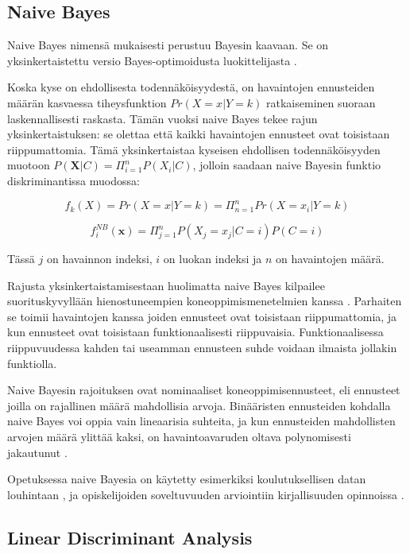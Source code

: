 \documentclass[finnish,twoside,openright]{HYgraduMLDS}
\begin{document}
\subsection{Naive Bayes}

Naive Bayes nimensä mukaisesti perustuu Bayesin kaavaan. Se on yksinkertaistettu versio Bayes-optimoidusta luokittelijasta \cite{rish2001empirical}.

Koska kyse on ehdollisesta todennäköisyydestä, on havaintojen ennusteiden määrän kasvaessa tiheysfunktion $Pr(X = x | Y = k)$ ratkaiseminen suoraan laskennallisesti raskasta. Tämän vuoksi naive Bayes tekee rajun yksinkertaistuksen: se olettaa että kaikki havaintojen ennusteet ovat toisistaan riippumattomia. Tämä yksinkertaistaa kyseisen ehdollisen todennäköisyyden muotoon $P(\textbf{X}|C) = \Pi^n_{i=1} P(X_i | C)$, jolloin saadaan naive Bayesin funktio diskriminantissa muodossa:

\begin{equation}
    f_k(X) = Pr(X = x | Y = k) = \Pi^n_{n=1} Pr(X = x_i | Y = k)
\end{equation}

\begin{equation}
    f^{NB}_i(\textbf{x}) = \Pi^n_{j=1} P(X_j=x_j | C=i) P(C=i)
\end{equation}

Tässä $j$ on havainnon indeksi, $i$ on luokan indeksi ja $n$ on havaintojen määrä. 

Rajusta yksinkertaistamisestaan huolimatta naive Bayes kilpailee suorituskyvyllään hienostuneempien koneoppimismenetelmien kanssa \cite{rish2001empirical}. Parhaiten se toimii havaintojen kanssa joiden ennusteet ovat toisistaan riippumattomia, ja kun ennusteet ovat toisistaan funktionaalisesti riippuvaisia. Funktionaalisessa riippuvuudessa kahden tai useamman ennusteen suhde voidaan ilmaista jollakin funktiolla.

Naive Bayesin rajoituksen ovat nominaaliset koneoppimisennusteet, eli ennusteet joilla on rajallinen määrä mahdollisia arvoja. Binääristen ennusteiden kohdalla naive Bayes voi oppia vain lineaarisia suhteita, ja kun ennusteiden mahdollisten arvojen määrä ylittää kaksi, on havaintoavaruden oltava polynomisesti jakautunut \cite{rish2001empirical}.

Opetuksessa naive Bayesia on käytetty esimerkiksi koulutuksellisen datan louhintaan \cite{bhardwaj2012data}, ja opiskelijoiden soveltuvuuden arviointiin kirjallisuuden opinnoissa \cite{hellas2018predicting}.


\subsection{Linear Discriminant Analysis}
\end{document}
